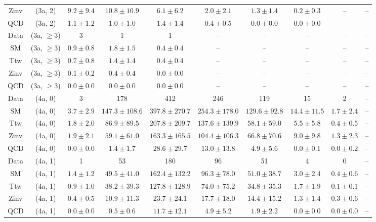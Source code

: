 \begin{table}[h!]
{\begin{tabular}{cccccccccc}
	Zinv & (3a, 2) & $9.2\pm 9.4$ & $10.8\pm 10.9$ & $6.1\pm 6.2$ & $2.0\pm 2.1$ & $1.3\pm 1.4$ & $0.2\pm 0.3$ & -- & -- \\[0.5ex] 
	QCD & (3a, 2) & $1.1\pm 1.2$ & $1.0\pm 1.0$ & $1.4\pm 1.4$ & $0.4\pm 0.5$ & $0.0\pm 0.0$ & $0.0\pm 0.0$ & -- & -- \\[0.5ex] 
	Data & (3a, $\ge3$) & 3 & 1 & 1 & -- & -- & -- & -- & -- \\[0.5ex] 
	SM & (3a, $\ge3$) & $0.9\pm 0.8$ & $1.8\pm 1.5$ & $0.4\pm 0.4$ & -- & -- & -- & -- & -- \\[0.5ex] 
	Ttw & (3a, $\ge3$) & $0.7\pm 0.8$ & $1.4\pm 1.4$ & $0.4\pm 0.4$ & -- & -- & -- & -- & -- \\[0.5ex] 
	Zinv & (3a, $\ge3$) & $0.1\pm 0.2$ & $0.4\pm 0.4$ & $0.0\pm 0.0$ & -- & -- & -- & -- & -- \\[0.5ex] 
	QCD & (3a, $\ge3$) & $0.0\pm 0.0$ & $0.0\pm 0.0$ & $0.0\pm 0.0$ & -- & -- & -- & -- & -- \\[0.5ex] 
	Data & (4a, 0) & 3 & 178 & 412 & 246 & 119 & 15 & 2 & -- \\[0.5ex] 
	SM & (4a, 0) & $3.7\pm 2.9$ & $147.3\pm 108.6$ & $397.8\pm 270.7$ & $254.3\pm 178.0$ & $129.6\pm 92.8$ & $14.4\pm 11.5$ & $1.7\pm 2.4$ & -- \\[0.5ex] 
	Ttw & (4a, 0) & $1.8\pm 2.0$ & $86.9\pm 89.5$ & $207.8\pm 209.7$ & $137.6\pm 139.9$ & $58.1\pm 59.0$ & $5.5\pm 5.8$ & $0.4\pm 0.5$ & -- \\[0.5ex] 
	Zinv & (4a, 0) & $1.9\pm 2.1$ & $59.1\pm 61.0$ & $163.3\pm 165.5$ & $104.4\pm 106.3$ & $66.8\pm 70.6$ & $9.0\pm 9.8$ & $1.3\pm 2.3$ & -- \\[0.5ex] 
	QCD & (4a, 0) & $0.0\pm 0.0$ & $1.4\pm 1.7$ & $28.6\pm 29.7$ & $13.0\pm 13.8$ & $4.9\pm 5.6$ & $0.0\pm 0.1$ & $0.0\pm 0.2$ & -- \\[0.5ex] 
	Data & (4a, 1) & 1 & 53 & 180 & 96 & 51 & 4 & 0 & -- \\[0.5ex] 
	SM & (4a, 1) & $1.4\pm 1.2$ & $49.5\pm 41.0$ & $162.4\pm 132.2$ & $96.3\pm 78.0$ & $51.0\pm 38.7$ & $3.0\pm 2.4$ & $0.4\pm 0.6$ & -- \\[0.5ex] 
	Ttw & (4a, 1) & $0.9\pm 1.0$ & $38.2\pm 39.3$ & $127.8\pm 128.9$ & $74.0\pm 75.2$ & $34.8\pm 35.3$ & $1.7\pm 1.9$ & $0.1\pm 0.1$ & -- \\[0.5ex] 
	Zinv & (4a, 1) & $0.4\pm 0.5$ & $10.9\pm 11.3$ & $23.7\pm 24.1$ & $17.7\pm 18.0$ & $14.4\pm 15.2$ & $1.3\pm 1.4$ & $0.3\pm 0.6$ & -- \\[0.5ex] 
	QCD & (4a, 1) & $0.0\pm 0.0$ & $0.5\pm 0.6$ & $11.7\pm 12.1$ & $4.9\pm 5.2$ & $1.9\pm 2.2$ & $0.0\pm 0.0$ & $0.0\pm 0.0$ & -- \\[0.5ex] 

\end{tabular}}
\end{table}
